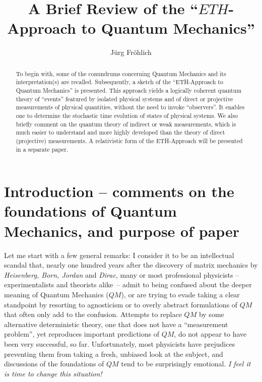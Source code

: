 \documentclass[a4paper,11pt]{article}
\author{J\"{u}rg Fr\"{o}hlich}
\title{A Brief Review of the ``$ETH$- Approach to Quantum Mechanics''}
\begin{document}
\maketitle

\begin{abstract}
To begin with, some of the conundrums concerning Quantum Mechanics and its interpretation(s) are recalled. Subsequently, a sketch of the ``ETH-Approach to Quantum Mechanics'' is presented. This approach yields a logically coherent quantum theory of ``events'' featured by isolated physical systems and of direct or projective measurements of physical quantities, without the need to invoke ``observers''. It enables one to determine the stochastic time evolution of states of physical systems. 
We also briefly comment on the quantum theory of indirect or weak measurements, which is much easier to understand and more highly developed than the theory of direct (projective) measurements. 
A relativistic form of the ETH-Approach will be presented in a separate paper. 
\end{abstract}

\tableofcontents

\section{Introduction -- comments on the foundations of Quantum Mechanics, and purpose of paper}\label{Intro}


Let me start with a few general remarks: I consider it to be an intellectual scandal that, nearly one hundred years after the discovery of matrix mechanics by \textit{Heisenberg, Born, Jordan} and \textit{Dirac}, many or most professional physicists -- experimentalists and theorists \mbox{alike --} admit to being confused about the deeper meaning of Quantum Mechanics ($QM$), or are trying to evade taking a clear standpoint by resorting to agnosticism or to overly abstract formulations of $QM$ that often only add to the confusion. Attempts to replace $QM$ by some alternative deterministic theory, one that does not have a ``measurement problem'', yet reproduces important predictions of $QM$, do not appear to have been very successful, so far. Unfortunately, most physicists have prejudices preventing them from taking a fresh, unbiased look at the subject, and discussions of the foundations of $QM$ tend to be surprisingly emotional. \textit{I feel it is time to change this situation!}
\end{document}
